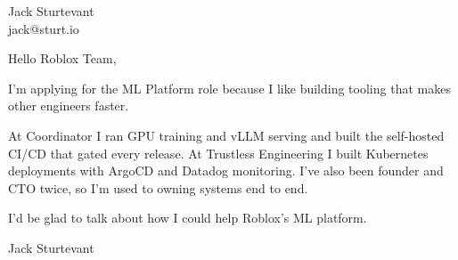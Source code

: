 \documentclass[11pt]{article}
\begin{document}
\raggedright

{\namefont\fontsize{20pt}{24pt}\selectfont Jack Sturtevant}\\[-0.3em]
jack@sturt.io

\vspace{1.2em}

Hello Roblox Team,

I'm applying for the ML Platform role because I like building tooling that makes other engineers faster.

At Coordinator I ran GPU training and vLLM serving and built the self-hosted CI/CD that gated every release. At Trustless Engineering I built Kubernetes deployments with ArgoCD and Datadog monitoring. I've also been founder and CTO twice, so I'm used to owning systems end to end.

I'd be glad to talk about how I could help Roblox's ML platform.

\vspace{0.6em}
Jack Sturtevant
\end{document}
